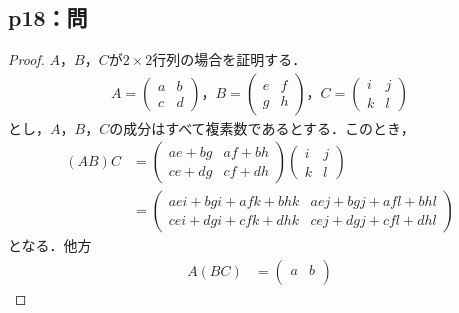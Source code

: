 \documentclass[uplatex,dvipdfmx,a4paper,10pt,fleqn]{jsarticle}
\begin{document}
\subsection*{p18：問}

\begin{tleftbar}
    \begin{proof}
        $A$，$B$，$C$が$2 \times 2$行列の場合を証明する．
        \begin{gather*}
            A=
            \begin{pmatrix}
                a & b \\
                c & d
            \end{pmatrix}
            ，
            B=
            \begin{pmatrix}
                e & f \\
                g & h
            \end{pmatrix}
            ，C=
            \begin{pmatrix}
                i & j \\
                k & l
            \end{pmatrix}
        \end{gather*}
        とし，$A$，$B$，$C$の成分はすべて複素数であるとする．このとき，
        \begin{align*}
            (AB)C & =
            \begin{pmatrix}
                ae+bg & af+bh \\
                ce+dg & cf+dh
            \end{pmatrix}
            \begin{pmatrix}
                i & j \\
                k & l
            \end{pmatrix}
            \\
            & =
            \begin{pmatrix}
                aei +bgi +afk +bhk & aej+bgj+afl+bhl \\
                cei +dgi+cfk +dhk & cej +dgj + cfl +dhl
            \end{pmatrix}
        \end{align*}
            となる．他方
            \begin{align*}
                A(BC)& =
                \begin{pmatrix}
                    a & b \\

\end{pmatrix}
\end{align*}
\end{proof}
\end{tleftbar}
\end{document}
